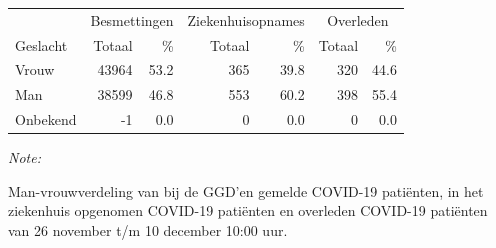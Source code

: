 \documentclass[
  english,
  man,floatsintext]{apa6}
\begin{document}
\begin{table}[H]
\centering\begingroup\fontsize{11}{13}\selectfont

\begin{threeparttable}
\begin{tabular}{lrrrrrr}
\toprule
\multicolumn{1}{c}{ } & \multicolumn{2}{c}{Besmettingen} & \multicolumn{2}{c}{Ziekenhuisopnames} & \multicolumn{2}{c}{Overleden} \\
\cmidrule(l{3pt}r{3pt}){2-3} \cmidrule(l{3pt}r{3pt}){4-5} \cmidrule(l{3pt}r{3pt}){6-7}
Geslacht & Totaal & \% & Totaal & \% & Totaal & \%\\
\midrule
Vrouw & 43964 & 53.2 & 365 & 39.8 & 320 & 44.6\\
Man & 38599 & 46.8 & 553 & 60.2 & 398 & 55.4\\
Onbekend & -1 & 0.0 & 0 & 0.0 & 0 & 0.0\\
\bottomrule
\end{tabular}
\begin{tablenotes}
\item \textit{Note: } 
\item Man-vrouwverdeling van bij de GGD’en gemelde COVID-19 patiënten, in het ziekenhuis opgenomen COVID-19 patiënten en overleden COVID-19 patiënten van 26 november t/m 10 december 10:00 uur.
\end{tablenotes}
\end{threeparttable}
\endgroup{}
\end{table}
\newpage
\end{document}
